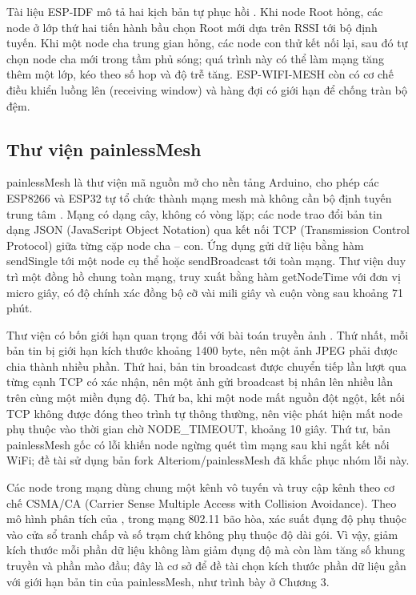 Tài liệu ESP-IDF mô tả hai kịch bản tự phục hồi \citep{espressif_mesh}. Khi node Root hỏng, các node ở lớp thứ hai tiến hành bầu chọn Root mới dựa trên RSSI tới bộ định tuyến. Khi một node cha trung gian hỏng, các node con thử kết nối lại, sau đó tự chọn node cha mới trong tầm phủ sóng; quá trình này có thể làm mạng tăng thêm một lớp, kéo theo số hop và độ trễ tăng. ESP-WIFI-MESH còn có cơ chế điều khiển luồng lên (receiving window) và hàng đợi có giới hạn để chống tràn bộ đệm.


\subsection{Thư viện painlessMesh}

painlessMesh là thư viện mã nguồn mở cho nền tảng Arduino, cho phép các ESP8266 và ESP32 tự tổ chức thành mạng mesh mà không cần bộ định tuyến trung tâm \citep{painlessmesh}. Mạng có dạng cây, không có vòng lặp; các node trao đổi bản tin dạng JSON (JavaScript Object Notation) qua kết nối TCP (Transmission Control Protocol) giữa từng cặp node cha – con. Ứng dụng gửi dữ liệu bằng hàm sendSingle tới một node cụ thể hoặc sendBroadcast tới toàn mạng. Thư viện duy trì một đồng hồ chung toàn mạng, truy xuất bằng hàm getNodeTime với đơn vị micro giây, có độ chính xác đồng bộ cỡ vài mili giây và cuộn vòng sau khoảng 71 phút.

Thư viện có bốn giới hạn quan trọng đối với bài toán truyền ảnh \citep{painlessmesh}. Thứ nhất, mỗi bản tin bị giới hạn kích thước khoảng 1400 byte, nên một ảnh JPEG phải được chia thành nhiều phần. Thứ hai, bản tin broadcast được chuyển tiếp lần lượt qua từng cạnh TCP có xác nhận, nên một ảnh gửi broadcast bị nhân lên nhiều lần trên cùng một miền đụng độ. Thứ ba, khi một node mất nguồn đột ngột, kết nối TCP không được đóng theo trình tự thông thường, nên việc phát hiện mất node phụ thuộc vào thời gian chờ NODE\_TIMEOUT, khoảng 10 giây. Thứ tư, bản painlessMesh gốc có lỗi khiến node ngừng quét tìm mạng sau khi ngắt kết nối WiFi; đề tài sử dụng bản fork Alteriom/painlessMesh \citep{alteriom} đã khắc phục nhóm lỗi này.

Các node trong mạng dùng chung một kênh vô tuyến và truy cập kênh theo cơ chế CSMA/CA (Carrier Sense Multiple Access with Collision Avoidance). Theo mô hình phân tích của \citet{bianchi2000}, trong mạng 802.11 bão hòa, xác suất đụng độ phụ thuộc vào cửa sổ tranh chấp và số trạm chứ không phụ thuộc độ dài gói. Vì vậy, giảm kích thước mỗi phần dữ liệu không làm giảm đụng độ mà còn làm tăng số khung truyền và phần mào đầu; đây là cơ sở để đề tài chọn kích thước phần dữ liệu gần với giới hạn bản tin của painlessMesh, như trình bày ở Chương 3.


